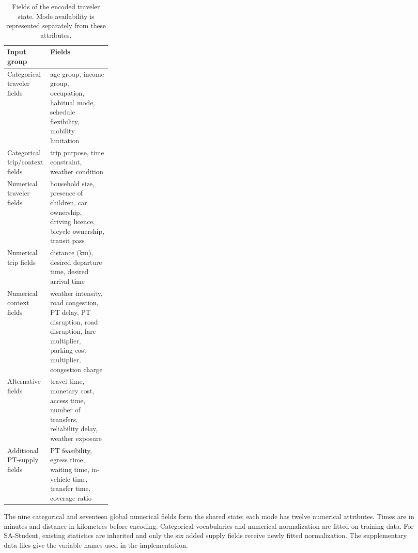 \begin{table}[pos=htbp]
\centering\small
\caption{Fields of the encoded traveler state. Mode availability is represented separately from these attributes.}
\label{tab:input_dictionary}
\renewcommand{\arraystretch}{1.12}
\begin{tabularx}{\linewidth}{@{}p{0.25\linewidth}X@{}}
\toprule
Input group & Fields \\
\midrule
Categorical traveler fields & age group, income group, occupation, habitual mode, schedule flexibility, mobility limitation \\
Categorical trip/context fields & trip purpose, time constraint, weather condition \\
Numerical traveler fields & household size, presence of children, car ownership, driving licence, bicycle ownership, transit pass \\
Numerical trip fields & distance (km), desired departure time, desired arrival time \\
Numerical context fields & weather intensity, road congestion, PT delay, PT disruption, road disruption, fare multiplier, parking cost multiplier, congestion charge \\
Alternative fields & travel time, monetary cost, access time, number of transfers, reliability delay, weather exposure \\
Additional PT-supply fields & PT feasibility, egress time, waiting time, in-vehicle time, transfer time, coverage ratio \\
\bottomrule
\end{tabularx}
\par\smallskip\begin{minipage}{\linewidth}\footnotesize
The nine categorical and seventeen global numerical fields form the shared state; each mode has twelve numerical attributes. Times are in minutes and distance in kilometres before encoding. Categorical vocabularies and numerical normalization are fitted on training data. For SA-Student, existing statistics are inherited and only the six added supply fields receive newly fitted normalization. The supplementary data files give the variable names used in the implementation.
\end{minipage}
\end{table}
